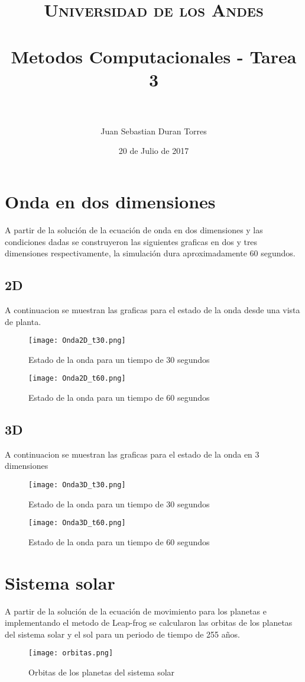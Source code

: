 \documentclass[paper=a4, fontsize=11pt]{scrartcl} %
\title{
\normalfont \normalsize 
\textsc{Universidad de los Andes} \\ [25pt]
\horrule{0.5pt} \\[0.4cm]
\huge Metodos Computacionales - Tarea 3  \\ 
\horrule{2pt} \\[0.5cm] 
}
\author{Juan Sebastian Duran Torres}
\date{20 de Julio de 2017}
\begin{document}
\maketitle


\section{Onda en dos dimensiones}

A partir de la solución de la ecuación de onda en dos dimensiones y las condiciones dadas se construyeron las siguientes graficas en dos y tres dimensiones respectivamente, la simulación dura aproximadamente 60 segundos.
\subsection{ 2D} 
A continuacion se  muestran las graficas para el estado de la onda desde una vista de planta.
\begin{figure}[h]
	\centering
	\texttt{[image: Onda2D\_t30.png]}
	\caption{Estado de la onda para un tiempo de 30 segundos}
\end{figure}

\begin{figure}[h]
	\centering
	\texttt{[image: Onda2D\_t60.png]}
	\caption{Estado de la onda para un tiempo de 60 segundos}
\end{figure}


\subsection{3D}
A continuacion se muestran las graficas para el estado de la onda en 3 dimensiones

\begin{figure}[h]
	\centering
	\texttt{[image: Onda3D\_t30.png]}
	\caption{Estado de la onda para un tiempo de 30 segundos}
\end{figure}

\begin{figure}[h]
	\centering
	\texttt{[image: Onda3D\_t60.png]}
	\caption{Estado de la onda para un tiempo de 60 segundos}
\end{figure}



\section{Sistema solar}

A partir de la solución de la ecuación de movimiento para los planetas e implementando el metodo de Leap-frog se calcularon las orbitas de los planetas del sistema solar y el sol para un periodo de tiempo de 255 años.
\begin{figure}[h]
	\centering
	\texttt{[image: orbitas.png]}
	\caption{Orbitas de los planetas del sistema solar}
\end{figure}
\end{document}
